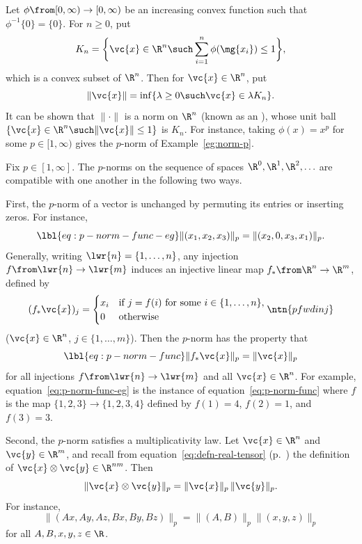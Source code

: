 \begin{example}
Let $\phi \from [0, \infty) \to [0, \infty)$ be an increasing convex
function such that $\phi^{-1}\{0\} = \{0\}$.  For $n \geq 0$, put
\[
K_n
=
\biggl\{ 
\vc{x} \in \R^n \such \sum_{i = 1}^n \phi(\mg{x_i}) \leq 1 
\biggr\},
\]
which is a convex subset of $\R^n$.  Then for $\vc{x} \in \R^n$, put
\[
\|\vc{x}\| = \inf \{ \lambda \geq 0 \such \vc{x} \in \lambda K_n \}.
\]
It can be shown that $\|\cdot\|$ is a norm on $\R^n$ (known as an
), whose unit ball $\{ \vc{x} \in \R^n \such \|\vc{x}\| \leq 1 \}$
is $K_n$.  For instance, taking $\phi(x) = x^p$ for some $p \in [1,
  \infty)$ gives the $p$-norm of Example~\ref{eg:norm-p}.
\end{example}

Fix $p \in [1, \infty]$.  The $p$-norms on the sequence of spaces $\R^0,
\R^1, \R^2, \ldots$ are compatible with one another in the following two
ways. 

First, the $p$-norm of a vector is unchanged by permuting its entries or
inserting zeros.  For instance,
% 
\begin{equation}
\lbl{eq:p-norm-func-eg}
\|(x_1, x_2, x_3)\|_p
=
\|(x_2, 0, x_3, x_1)\|_p.
\end{equation}
% 
Generally, writing $\lwr{n} = \{1, \ldots, n\}$, any injection $f \from
\lwr{n} \to \lwr{m}$ induces an injective linear map $f_* \from \R^n \to
\R^m$, defined by
\[
(f_* \vc{x})_j
=
\begin{cases}
x_i     &\text{if } j = f(i) \text{ for some } i \in \{1, \ldots, n\},  \\
0       &\text{otherwise} 
\end{cases}
\ntn{pfwdinj}
\]
($\vc{x} \in \R^n$, $j \in \{1, \ldots, m\}$).  Then the $p$-norm has the
property that 
% 
\begin{equation}
\lbl{eq:p-norm-func}
\|f_* \vc{x}\|_p = \|\vc{x}\|_p
\end{equation}
% 
for all injections $f \from \lwr{n} \to \lwr{m}$ and all $\vc{x} \in \R^n$.
For example, equation~\eqref{eq:p-norm-func-eg} is the instance of
equation~\eqref{eq:p-norm-func} where $f$ is the map $\{1, 2, 3\} \to \{1,
2, 3, 4\}$ defined by $f(1) = 4$, $f(2) = 1$, and $f(3) = 3$.

Second, the $p$-norm satisfies a multiplicativity law.  Let $\vc{x} \in
\R^n$ and $\vc{y} \in \R^m$, and recall from
equation~\eqref{eq:defn-real-tensor} (p.~\pageref{eq:defn-real-tensor})
the definition of $\vc{x} \otimes \vc{y} \in \R^{nm}$.  Then
% 
\[
\|\vc{x} \otimes \vc{y}\|_p
=
\|\vc{x}\|_p \, \|\vc{y}\|_p.
\]
% 
For instance,
\[
\|(Ax, Ay, Az, Bx, By, Bz)\|_p
=
\|(A, B)\|_p \|(x, y, z)\|_p
\]
for all $A, B, x, y, z \in \R$.

